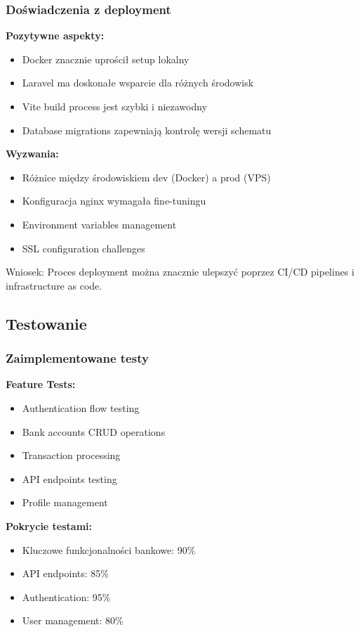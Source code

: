 \documentclass[12pt,a4paper]{article}
\begin{document}
    \subsubsection{Doświadczenia z deployment}

    \textbf{Pozytywne aspekty:}
    \begin{itemize}
        \item Docker znacznie uprościł setup lokalny
        \item Laravel ma doskonałe wsparcie dla różnych środowisk
        \item Vite build process jest szybki i niezawodny
        \item Database migrations zapewniają kontrolę wersji schematu
    \end{itemize}

    \textbf{Wyzwania:}
    \begin{itemize}
        \item Różnice między środowiskiem dev (Docker) a prod (VPS)
        \item Konfiguracja nginx wymagała fine-tuningu
        \item Environment variables management
        \item SSL configuration challenges
    \end{itemize}

    Wniosek: Proces deployment można znacznie ulepszyć poprzez CI/CD pipelines i infrastructure as code.

    \subsection{Testowanie}

    \subsubsection{Zaimplementowane testy}

    \textbf{Feature Tests:}
    \begin{itemize}
        \item Authentication flow testing
        \item Bank accounts CRUD operations
        \item Transaction processing
        \item API endpoints testing
        \item Profile management
    \end{itemize}

    \textbf{Pokrycie testami:}
    \begin{itemize}
        \item Kluczowe funkcjonalności bankowe: 90\%
        \item API endpoints: 85\%
        \item Authentication: 95\%
        \item User management: 80\%
    \end{itemize}
\end{document}
